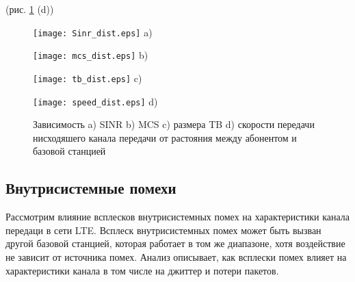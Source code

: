 (рис. \ref{img:dist} (d))


\begin{figure} [!h]
\begin{minipage}[h]{0.47\linewidth}
\center
\texttt{[image: Sinr\_dist.eps]} a) \\
\end{minipage}
\hfill
\begin{minipage}[h]{0.47\linewidth}
\center
\texttt{[image: mcs\_dist.eps]} b) \\
\end{minipage}
\vfill
\begin{minipage}[h]{0.47\linewidth}
\center
\texttt{[image: tb\_dist.eps]} c) \\
\end{minipage}
\hfill
\begin{minipage}[h]{0.47\linewidth}
\center
\texttt{[image: speed\_dist.eps]} d) \\
\end{minipage}
\caption{Зависимость a) SINR b) MCS c) размера TB d) скорости передачи нисходяшего канала передачи от растояния между абонентом и базовой станцией}
\label{img:dist}
\end{figure}

\subsection{Внутрисистемные помехи}  \label{sect2_2_3}
Рассмотрим влияние всплесков внутрисистемных помех на характеристики канала передаци в сети LTE. Всплеск внутрисистемных помех может быть вызван другой базовой станцией, которая работает в том же диапазоне, хотя воздействие не зависит от источника помех.
Анализ описывает, как всплески помех влияет на характеристики канала в том числе на джиттер и  потери пакетов.

